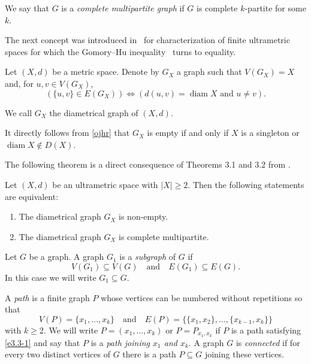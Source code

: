 \documentclass{article}
\begin{document}
We say that $G$ is a \emph{complete multipartite graph} if  $G$ is complete $k$-partite for some $k$.




The next concept was introduced in~\cite{PD2014JMS} for characterization of finite ultrametric spaces for which the Gomory--Hu inequality~\cite{GH1961S} turns to equality.



\begin{Definition}\label{dvhj} Let $(X,d)$ be a metric space. Denote by $G_{X}$ a graph
such that $V(G_{X}) = X$ and, for $u, v \in V(G_{X})$,
\begin{equation}
    \label{ojhr}
(\{u,v\} \in E(G_{X})) \iff (d(u,v) = \operatorname{diam} X \text{ and } u \ne v).
\end{equation}

We call $G_{X}$ the diametrical graph of $(X,d)$.
\end{Definition}

\begin{Remark}\label{suit}
It directly follows  from \eqref{ojhr} that $G_X$ is empty if and only if  $X$ is a singleton or $\operatorname{diam} X \notin D(X)$.
\end{Remark}


The following theorem is a direct consequence of Theorems 3.1 and 3.2 from \cite{DDP2011pNUAA}.

\begin{Theorem}\label{ref} Let $(X,d)$ be an ultrametric space with $|X| \geq 2$. Then the following
statements are equivalent:

\begin{enumerate}[label=\textit{(\roman*)}, left=0pt]
\item The diametrical graph $G_{X}$ is non-empty.
\item The diametrical graph $G_{X}$ is complete multipartite.
\end{enumerate}

\end{Theorem}






Let $G$ be a graph.
A graph \(G_1\) is a \emph{subgraph} of \(G\) if
\[
V(G_1) \subseteq V(G) \quad \text{and} \quad E(G_1) \subseteq E(G).
\]
In this case we will write \(G_1 \subseteq G\). 


A \emph{path} is a finite graph \(P\) whose vertices can be numbered without repetitions so that
\begin{equation}\label{e3.3-1}
V(P) = \{x_1, \ldots, x_k\} \quad \text{and} \quad E(P) = \{\{x_1, x_2\}, \ldots, \{x_{k-1}, x_k\}\}
\end{equation}
with \(k \geqslant 2\). We will write \(P = (x_1, \ldots, x_k)\) or \(P = P_{x_1, x_k}\) if \(P\) is a path satisfying \eqref{e3.3-1} and say that \(P\) is a \emph{path joining \(x_1\) and \(x_k\)}. A graph \(G\) is \emph{connected} if for every two distinct vertices of \(G\) there is a path \(P \subseteq G\) joining these vertices.
\end{document}
